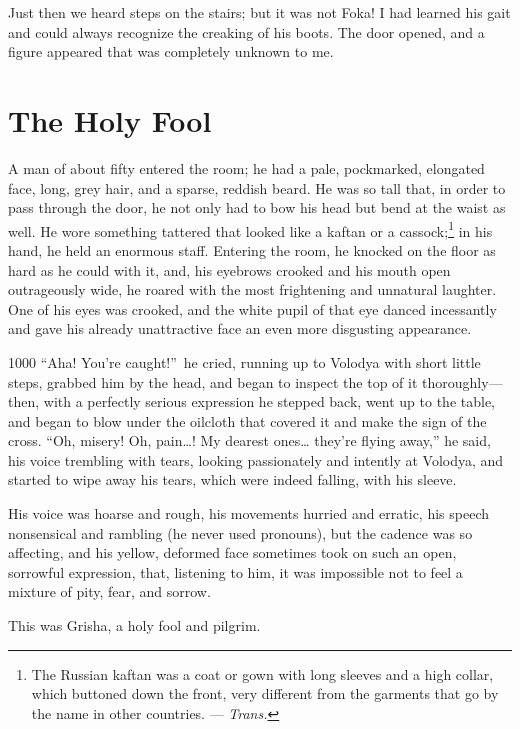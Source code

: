 Just then we heard steps on the stairs; but it was not Foka! I had learned his gait and could always recognize the creaking of his boots. The door opened, and a figure appeared that was completely unknown to me.

\chapter{The Holy Fool} %

A man of about fifty entered the room; he had a pale, pockmarked, elongated face, long, grey hair, and a sparse, reddish beard. He was so tall that, in order to pass through the door, he not only had to bow his head but bend at the waist as well. He wore something tattered that looked like a kaftan or a cassock;\footnote{The Russian kaftan was a coat or gown with long sleeves and a high collar, which buttoned down the front, very different from the garments that go by the name in other countries. --- \textit{Trans.}} in his hand, he held an enormous staff. Entering the room, he knocked on the floor as hard as he could with it, and, his eyebrows crooked and his mouth open outrageously wide, he roared with the most frightening and unnatural laughter. One of his eyes was crooked, and the white pupil of that eye danced incessantly and gave his already unattractive face an even more disgusting appearance.

\begin{tolerant}{1000}
``Aha! You're caught!''~he cried, running up to Volodya with short little steps, grabbed him by the head, and began to inspect the top of it thoroughly---then, with a perfectly serious expression he stepped back, went up to the table, and began to blow under the oilcloth that covered it and make the sign of the cross. ``Oh, misery! Oh, pain\ldots{}! My dearest ones\ldots{} they're flying away,'' he said, his voice trembling with tears, looking passionately and intently at Volodya, and started to wipe away his tears, which were indeed falling, with his sleeve. %
\end{tolerant}

His voice was hoarse and rough, his movements hurried and erratic, his speech nonsensical and rambling (he never used pronouns), but the cadence was so affecting, and his yellow, deformed face sometimes took on such an open, sorrowful expression, that, listening to him, it was impossible not to feel a mixture of pity, fear, and sorrow.

This was Grisha, a holy fool and pilgrim.

